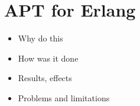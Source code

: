 \section{APT for Erlang}

\begin{itemize}
	\item Why do this
	\item How was it done 
	\item Results, effects 
    \item Problems and limitations
\end{itemize}
